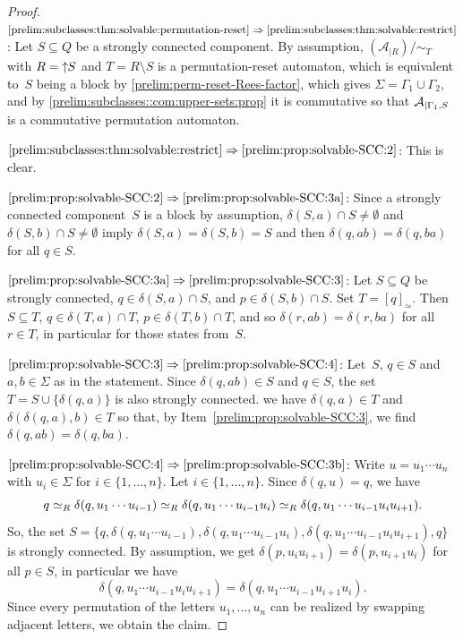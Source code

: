 \begin{proof}
$\ref{prelim:subclasses:thm:solvable:permutation-reset} \Rightarrow \ref{prelim:subclasses:thm:solvable:restrict}$:
Let $S \subseteq Q$ be a strongly connected component. By assumption,
$( \mathcal A_{|R} ) / {\sim_T}$ with $R = \mbox{\ensuremath{\displaystyle \uparrow \!\!S}}$ and $T = R \setminus S$
is a permutation-reset automaton, which is equivalent
to~$S$ being a block by \cref{prelim:perm-reset-Rees-factor}, 
which gives $\Sigma = \Gamma_1 \cup \Gamma_2$,
and by \cref{prelim:subclasses::com:upper-sets:prop} it is commutative
so that  $\mathcal A_{|\Gamma_1, S}$
is a commutative permutation automaton.

$\ref{prelim:subclasses:thm:solvable:restrict} \Rightarrow \ref{prelim:prop:solvable-SCC:2}$:
This is clear.

$\ref{prelim:prop:solvable-SCC:2} \Rightarrow \ref{prelim:prop:solvable-SCC:3a}$:
Since a strongly connected component~$S$ is a block
by assumption, $\delta(S, a) \cap S \ne \emptyset$
and  $\delta(S, b) \cap S \ne \emptyset$
imply $\delta(S, a) = \delta(S, b) = S$ and then
$\delta(q, ab) = \delta(q, ba)$ for all $q \in S$.

$\ref{prelim:prop:solvable-SCC:3a} \Rightarrow \ref{prelim:prop:solvable-SCC:3}$:
Let $S \subseteq Q$ be strongly connected, $q \in \delta(S, a) \cap S$,
and $p \in \delta(S, b) \cap S$. Set $T = [q]_{\simeq}$.
Then $S \subseteq T$, $q \in \delta(T, a) \cap T$, $p \in \delta(T, b) \cap T$,
and so $\delta(r, ab) = \delta(r, ba)$ for all $r \in T$, in particular
for those states from~$S$.

$\ref{prelim:prop:solvable-SCC:3} \Rightarrow \ref{prelim:prop:solvable-SCC:4}$:
Let~$S$, $q \in S$ and $a,b \in \Sigma$ as in the statement.
Since $\delta(q, ab) \in S$ and $q \in S$, the set $T = S \cup \{\delta(q, a)\}$ is also strongly connected.
we have $\delta(q, a) \in T$ and $\delta(\delta(q, a), b) \in T$
so that, by Item~\ref{prelim:prop:solvable-SCC:3},
we find $\delta(q, ab) = \delta(q, ba)$.

$\ref{prelim:prop:solvable-SCC:4} \Rightarrow \ref{prelim:prop:solvable-SCC:3b}$:
Write $u = u_1 \cdots u_n$ with $u_i \in \Sigma$ for $i \in \{1,\ldots,n\}$.
Let $i \in \{1,\ldots,n\}$.
Since $\delta(q, u) = q$, we have 
\[
q \simeq_R \delta(q, u_1\cdots u_{i-1}) \simeq_R 
\delta(q, u_1\cdots u_{i-1} u_i) \simeq_R \delta(q, u_1\cdots u_{i-1} u_i u_{i+1}).
\]
So, the set $S = \{q, \delta(q, u_1\cdots u_{i-1}), \delta(q, u_1\cdots u_{i-1} u_i),
\delta(q, u_1\cdots u_{i-1} u_i u_{i+1}), q\}$
is strongly connected. By assumption,
we get $\delta(p, u_i u_{i+1}) = \delta(p, u_{i+1}u_i)$
for all $p \in S$, in particular
we have
\[\delta(q, u_1\cdots u_{i-1} u_i u_{i+1})
= \delta(q, u_1\cdots u_{i-1} u_{i+1} u_i).
\]
Since every permutation of the letters $u_1, \ldots, u_n$
can be realized by swapping adjacent letters, we obtain the claim.


\end{proof}
